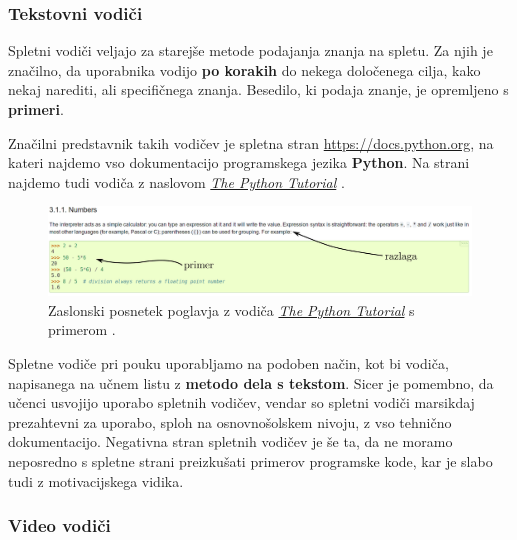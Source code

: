 \subsubsection{Tekstovni vodiči}

Spletni vodiči veljajo za starejše metode podajanja znanja na
spletu. Za njih je značilno, da uporabnika vodijo \textbf{po korakih}
do nekega določenega cilja, kako nekaj narediti, ali specifičnega
znanja. Besedilo, ki podaja znanje, je opremljeno s
\textbf{primeri}. \cite{wiki:tutorials}

Značilni predstavnik takih vodičev je spletna stran
\url{https://docs.python.org}, na kateri najdemo vso dokumentacijo
programskega jezika \textbf{Python}. Na strani najdemo tudi vodiča z
naslovom \emph{\href{https://docs.python.org/3/tutorial/index.html}{The
  Python Tutorial}} \cite{web:TPythonTut}.

\begin{figure}[h!]
  \includegraphics [width=1\linewidth, keepaspectratio =
  1] {./images/sc_web/tPyTut_01.jpg}
      \caption{Zaslonski posnetek poglavja z vodiča
      \emph{\href{https://docs.python.org/3/tutorial/index.html}{The
          Python Tutorial}} s primerom \cite{web:TPythonTut}.}
    \label{fig:scr:web:tPyTut}
\end{figure}

Spletne vodiče pri pouku uporabljamo na podoben način, kot bi vodiča,
napisanega na učnem listu z \textbf{metodo dela s tekstom}. Sicer je
pomembno, da učenci usvojijo uporabo spletnih vodičev, vendar so
spletni vodiči marsikdaj prezahtevni za uporabo, sploh na osnovnošolskem nivoju, z vso tehnično dokumentacijo. Negativna stran spletnih
vodičev je še ta, da ne moramo neposredno s spletne strani preizkušati
primerov programske kode, kar je slabo tudi z motivacijskega vidika.

\subsubsection{Video vodiči}
\label{sec:video_vodici}

